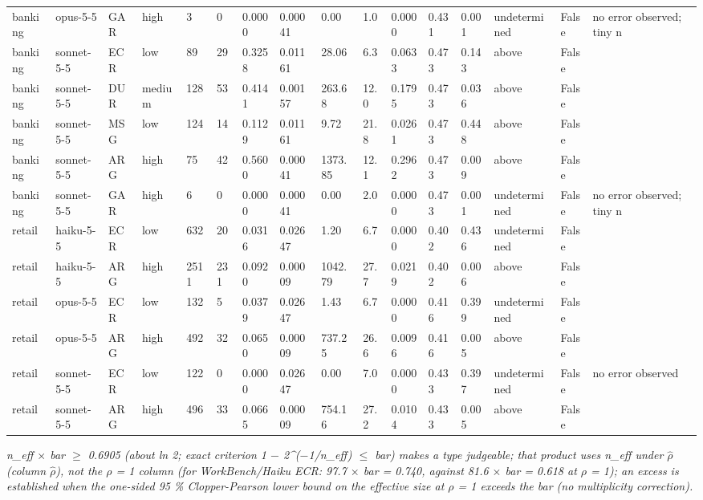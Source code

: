 \begin{table}[htbp]
{\begin{tabular}{llllllllllllllll}
banking & opus-5-5 & GAR & high & 3 & 0 & 0.0000 & 0.00041 & 0.00 & 1.0 & 0.0000 & 0.431 & 0.001 & undetermined & False & no error observed; tiny n \\
banking & sonnet-5-5 & ECR & low & 89 & 29 & 0.3258 & 0.01161 & 28.06 & 6.3 & 0.0633 & 0.473 & 0.143 & above & False &  \\
banking & sonnet-5-5 & DUR & medium & 128 & 53 & 0.4141 & 0.00157 & 263.68 & 12.0 & 0.1795 & 0.473 & 0.036 & above & False &  \\
banking & sonnet-5-5 & MSG & low & 124 & 14 & 0.1129 & 0.01161 & 9.72 & 21.8 & 0.0261 & 0.473 & 0.448 & above & False &  \\
banking & sonnet-5-5 & ARG & high & 75 & 42 & 0.5600 & 0.00041 & 1373.85 & 12.1 & 0.2962 & 0.473 & 0.009 & above & False &  \\
banking & sonnet-5-5 & GAR & high & 6 & 0 & 0.0000 & 0.00041 & 0.00 & 2.0 & 0.0000 & 0.473 & 0.001 & undetermined & False & no error observed; tiny n \\
retail & haiku-5-5 & ECR & low & 632 & 20 & 0.0316 & 0.02647 & 1.20 & 6.7 & 0.0000 & 0.402 & 0.436 & undetermined & False &  \\
retail & haiku-5-5 & ARG & high & 2511 & 231 & 0.0920 & 0.00009 & 1042.79 & 27.7 & 0.0219 & 0.402 & 0.006 & above & False &  \\
retail & opus-5-5 & ECR & low & 132 & 5 & 0.0379 & 0.02647 & 1.43 & 6.7 & 0.0000 & 0.416 & 0.399 & undetermined & False &  \\
retail & opus-5-5 & ARG & high & 492 & 32 & 0.0650 & 0.00009 & 737.25 & 26.6 & 0.0096 & 0.416 & 0.005 & above & False &  \\
retail & sonnet-5-5 & ECR & low & 122 & 0 & 0.0000 & 0.02647 & 0.00 & 7.0 & 0.0000 & 0.433 & 0.397 & undetermined & False & no error observed \\
retail & sonnet-5-5 & ARG & high & 496 & 33 & 0.0665 & 0.00009 & 754.16 & 27.2 & 0.0104 & 0.433 & 0.005 & above & False &  \\
\bottomrule
\end{tabular}}
\par\smallskip\parbox{\linewidth}{\tiny \emph{n\_eff $\times$ bar $\geq$ 0.6905 (about ln 2; exact criterion 1 $-$ 2\textasciicircum{}($-$1/n\_eff) $\leq$ bar) makes a type judgeable; that product uses n\_eff under $\hat\rho$ (column $\hat\rho$), not the $\rho$ = 1 column (for WorkBench/Haiku ECR: 97.7 $\times$ bar = 0.740, against 81.6 $\times$ bar = 0.618 at $\rho$ = 1); an excess is established when the one-sided 95 \% Clopper-Pearson lower bound on the effective size at $\rho$ = 1 exceeds the bar (no multiplicity correction).}}
\end{table}
